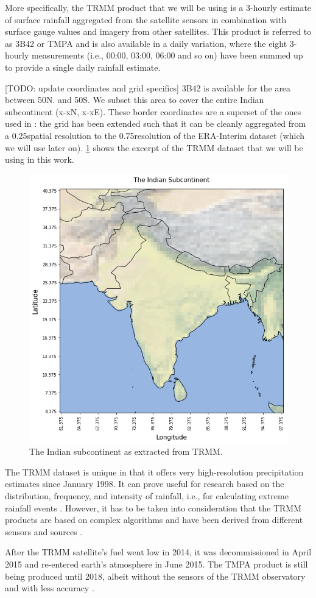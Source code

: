 More specifically, the TRMM product that we will be using is a 3-hourly estimate of surface rainfall aggregated from the satellite sensors in combination with surface gauge values and imagery from other satellites. This product is referred to as 3B42 or TMPA and is also available in a daily variation, where the eight 3-hourly measurements (i.e., 00:00, 03:00, 06:00 and so on) have been summed up to provide a single daily rainfall estimate.

[TODO: update coordinates and grid specifics] 3B42 is available for the area between 50\degree N. and 50\degree S. We subset this area to cover the entire Indian subcontinent (x-x\degree N, x-x\degree E). These border coordinates are a superset of the ones used in \citep{Stolbova.2015}: the grid has been extended  such that it can be cleanly aggregated from a 0.25\degree spatial resolution to the 0.75\degree resolution of the ERA-Interim dataset (which we will use later on). \cref{fig:trmm_area} shows the excerpt of the TRMM dataset that we will be using in this work.

\begin{figure}[h]
  \centering
  \includegraphics[width=0.5\linewidth]{./99_appendix/img/area_overview}
  \caption{The Indian subcontinent as extracted from TRMM.}
  \label{fig:trmm_area}
\end{figure}

The TRMM dataset is unique in that it offers very high-resolution precipitation estimates since January 1998. It can prove useful for research based on the distribution, frequency, and intensity of rainfall, i.e., for calculating extreme rainfall events \citep{Stolbova.2015}. However, it has to be taken into consideration that the TRMM products are based on complex algorithms and have been derived from different sensors and sources \citep{Huffman.2017b}.

After the TRMM satellite's fuel went low in 2014, it was decommissioned in April 2015 and re-entered earth's atmosphere in June 2015. The TMPA product is still being produced until 2018, albeit without the sensors of the TRMM observatory and with less accuracy \citep{Huffman.2017}.

